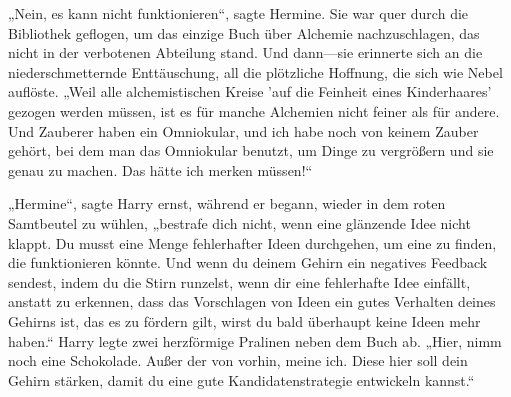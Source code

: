 „Nein, es kann nicht funktionieren“, sagte Hermine. Sie war quer durch die Bibliothek geflogen, um das einzige Buch über Alchemie nachzuschlagen, das nicht in der verbotenen Abteilung stand. Und dann—sie erinnerte sich an die niederschmetternde Enttäuschung, all die plötzliche Hoffnung, die sich wie Nebel auflöste. „Weil alle alchemistischen Kreise 'auf die Feinheit eines Kinderhaares' gezogen werden müssen, ist es für manche Alchemien nicht feiner als für andere. Und Zauberer haben ein Omniokular, und ich habe noch von keinem Zauber gehört, bei dem man das Omniokular benutzt, um Dinge zu vergrößern und sie genau zu machen. Das hätte ich merken müssen!“

„Hermine“, sagte Harry ernst, während er begann, wieder in dem roten Samtbeutel zu wühlen, „bestrafe dich nicht, wenn eine glänzende Idee nicht klappt. Du musst eine Menge fehlerhafter Ideen durchgehen, um eine zu finden, die funktionieren könnte. Und wenn du deinem Gehirn ein negatives Feedback sendest, indem du die Stirn runzelst, wenn dir eine fehlerhafte Idee einfällt, anstatt zu erkennen, dass das Vorschlagen von Ideen ein gutes Verhalten deines Gehirns ist, das es zu fördern gilt, wirst du bald überhaupt keine Ideen mehr haben.“
Harry legte zwei herzförmige Pralinen neben dem Buch ab.
„Hier, nimm noch eine Schokolade. Außer der von vorhin, meine ich. Diese hier soll dein Gehirn stärken, damit du eine gute Kandidatenstrategie entwickeln kannst.“

